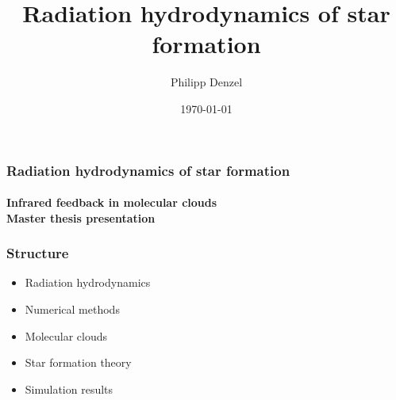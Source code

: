 \documentclass{beamer}
\title{Radiation hydrodynamics of star formation}
\author{Philipp Denzel}
\date{\today}
\institute{Institute for Computational Science}
\begin{document}
{
\begin{frame}
 \frametitle{Radiation hydrodynamics of star formation}
 \framesubtitle{Infrared feedback in molecular clouds\\Master thesis presentation}
\end{frame}
}
\begin{frame}
\frametitle{Structure}
\begin{itemize}
  \item Radiation hydrodynamics\\[15pt]
  \item Numerical methods\\[15pt]
  \item Molecular clouds\\[15pt]
  \item Star formation theory\\[15pt]
  \item Simulation results\\[15pt]
\end{itemize}

\end{frame}
\end{document}
